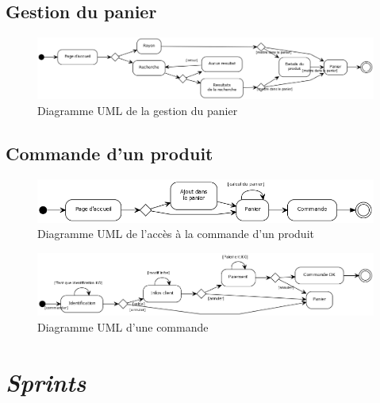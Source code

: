 \documentclass[12pt]{article}
\begin{document}
\subsection{Gestion du panier}

\begin{figure}[ht]
    \center
    \includegraphics[scale=0.4]{../Diagrams/ActivityDiagrams/panier.png}
    \caption*{Diagramme UML de la gestion du panier}
\end{figure}

\subsection{Commande d'un produit}

\begin{figure}[ht]
    \center
    \includegraphics[scale=0.55]{../Diagrams/ActivityDiagrams/commande_global.png}
    \caption*{Diagramme UML de l'accès à la commande d'un produit}
\end{figure}

\begin{figure}[ht]
    \center
    \includegraphics[scale=0.45]{../Diagrams/ActivityDiagrams/commande_en_cours.png}
    \caption*{Diagramme UML d'une commande}
\end{figure}

\newpage
\section{\textit{Sprints}}
\end{document}
